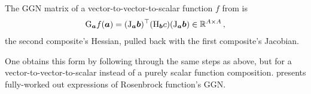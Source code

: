 \begin{definition}\label{def:vector_ggn}
  The GGN matrix of a vector-to-vector-to-scalar function $f$ from  is
  \begin{align*}
    \mathrm{G}_{{\bm{a}}} f({\bm{a}})
    =
    (\mathrm{J}_{{\bm{a}}} {\bm{b}})^{\top}
    (\mathrm{H}_{{\bm{b}}} c)
    (\mathrm{J}_{{\bm{a}}} {\bm{b}}) \in {\mathbb{R}}^{A \times A}\,,
  \end{align*}
  \ie the second composite's Hessian, pulled back with the first composite's Jacobian.
\end{definition}

One obtains this form by following through the same steps as above, but for a vector-to-vector-to-scalar instead of a purely scalar function composition.  presents fully-worked out expressions of Rosenbrock function's GGN.


